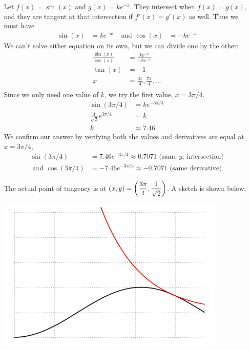 \begin{enumerate}[1.]
\begin{multicols}{2}
\begin{Question}
    
  \end{Question}
  \begin{Solution}
Let $f(x) = \sin(x)$ and $g(x) = k e^{-x}$.  They intersect
  when $f(x) = g(x)$, and they are tangent at that intersection if
  $f'(x) = g'(x)$ as well.  Thus we must have
  \begin{align*}
    \sin(x) & = k e^{-x} & \mbox{ and } \cos(x) & = -k e^{-x}
  \end{align*}
  We can't solve either equation on its own, but we can divide one by
  the other:
  \begin{align*}
    \frac{\sin(x)}{\cos(x)} & = \frac{k e^{-x}}{-ke^{-x}} \\
    \tan(x) & = -1 \\
    x & = \frac{3\pi }{4}, \frac{7 \pi}{4}, \ldots \\
  \end{align*}
  Since we only need one value of $k$, we try the first value, $x = 3
  \pi/4$.
\begin{align*}
\sin(3\pi/4) & = k e^{-3\pi/4} \\
\frac{1}{\sqrt{2}} e^{3\pi/4} & = k  \\
k & \approx 7.46 
\end{align*}
We confirm our answer by verifying both the values and derivatives are
equal at $x = 3\pi/4$,
  \begin{align*}
    \sin(3 \pi / 4) & = 7.46 e^{-3\pi/4} \approx 0.7071  \mbox{ (same $y$: intersection)}\\
 \mbox{ and } \cos(3\pi/4) & = -7.46 e^{-3\pi/4} \approx -0.7071  \mbox{ (same derivative)}
  \end{align*}

  The actual point of tangency is at $\displaystyle (x, y) = \left(\frac{3\pi}{4},
    \frac{1}{\sqrt{2}}\right)$.  A sketch is shown below.
  
  \includegraphics[width=0.8\linewidth]{graphics/Week02_TangentLines/Sine_exp_tangency} 
    

\end{Solution}
\end{multicols}
\end{enumerate}
